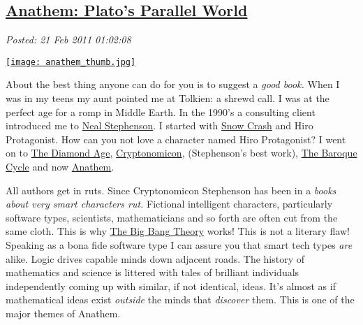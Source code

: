 %

\subsection*{\href{https://bakerjd99.wordpress.com/2011/02/20/anathem-platos-parallel-world/}{Anathem: Plato's Parallel World}}


\noindent\emph{Posted: 21 Feb 2011 01:02:08}
\vspace{6pt}

\captionsetup[floatingfigure]{labelformat=empty}
\begin{floatingfigure}[l]{0.25\textwidth}
\centering
\href{http://www.amazon.com/Anathem-Neal-Stephenson/dp/0061474096}{\texttt{[image: anathem\_thumb.jpg]}}
\label{fig:1124X0}
\end{floatingfigure}About the best thing anyone can do for you is to suggest a \emph{good
book.} When I was in my teens my aunt pointed me at Tolkien: a shrewd
call. I was at the perfect age for a romp in Middle Earth. In the 1990's
a consulting client introduced me to
\href{http://www.nealstephenson.com/}{Neal Stephenson}. I started with
\href{http://www.amazon.com/Snow-Crash-Bantam-Spectra-Book/dp/0553380958}{Snow
Crash} and Hiro Protagonist. How can you not love a character named Hiro
Protagonist? I went on to
\href{http://www.amazon.com/Diamond-Age-Neal-Stephenson/dp/0553573314}{The
Diamond Age},
\href{http://www.amazon.com/Cryptonomicon-Neal-Stephenson/dp/0380973464}{Cryptonomicon},
(Stephenson's best work),
\href{http://en.wikipedia.org/wiki/The\_Baroque\_Cycle}{The Baroque
Cycle} and now
\href{http://www.amazon.com/Anathem-Neal-Stephenson/dp/0061474096}{Anathem}.

All authors get in ruts. Since Cryptonomicon Stephenson has been in a
\emph{books about very smart characters rut.} Fictional intelligent
characters, particularly software types, scientists, mathematicians and
so forth are often cut from the same cloth. This is why
\href{http://www.cbs.com/primetime/big\_bang\_theory/}{The Big Bang
Theory} works!
This is not a literary flaw! Speaking as a bona fide software type I can
assure you that smart tech types \emph{are} alike. Logic drives capable
minds down adjacent roads. The history of mathematics and science is
littered with tales of brilliant individuals independently coming up
with similar, if not identical, ideas. It's almost as if mathematical
ideas exist \emph{outside} the minds that \emph{discover} them. This is
one of the major themes of Anathem.

